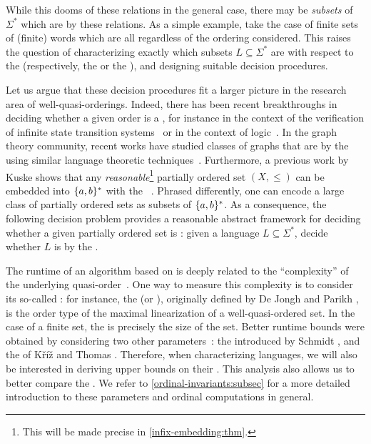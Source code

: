 \AP While this dooms  of these
relations in the general case, there may be \emph{subsets} of $\Sigma^*$ which
are  by these relations. As a simple example, take the
case of finite sets of (finite) words which are all 
regardless of the ordering considered. This raises the question of
characterizing exactly which subsets $L \subseteq \Sigma^*$ are
 with respect to the  (respectively,
the  or the ), and designing
suitable decision procedures.

\AP Let us argue that these decision procedures fit a larger picture in the
research area of well-quasi-orderings.
Indeed, there has been recent breakthroughs in deciding whether a given order
is a , for instance in the context of the verification of
infinite state transition systems~\cite{DBLP:conf/fsttcs/FinkelG19} or in the
context of logic~\cite{DBLP:journals/pacmpl/BergstrasserGLZ24}.
In the graph theory community, recent works have studied classes of graphs 
that are  by the 
using similar language theoretic techniques~\cite{DRT10,lopez25,ALM17}.
Furthermore, a previous work by Kuske shows that any
\emph{reasonable}\footnote{ This will be made precise in
\cref{infix-embedding:thm}. } partially ordered set $(X, \leq)$ can
be embedded into $\{ a,b \}^*$ with the ~\cite[Lemma
5.1]{DBLP:journals/ita/Kuske06}. Phrased differently, one can encode a large
class of partially ordered sets as subsets of $\{ a,b \}^*$. As a consequence,
the following decision problem provides a reasonable abstract framework for
deciding whether a given partially ordered set is :
given a language $L \subseteq \Sigma^*$, decide whether $L$ is
 by the .

\AP The runtime of an algorithm based on  is deeply
related to the ``complexity'' of the underlying quasi-order~\cite{SCHMITZ17}.
One way to measure this complexity is to consider its so-called : for instance, the  (or ),
originally defined by De Jongh and Parikh \cite{dejongh77}, is the order type
of the maximal linearization of a well-quasi-ordered set. In the case of a
finite set, the  is precisely the size of the set. Better runtime
bounds were obtained by considering two other parameters~\cite{SCHMITZ19}: the
 introduced by Schmidt \cite{schmidt81}, and the  of Kříž and Thomas \cite{kriz90b}. Therefore, when characterizing
 languages, we will also be interested in deriving upper
bounds on their . This analysis also allows us to better
compare the . We refer to
\cref{ordinal-invariants:subsec} for a more detailed introduction to these
parameters and ordinal computations in general.

